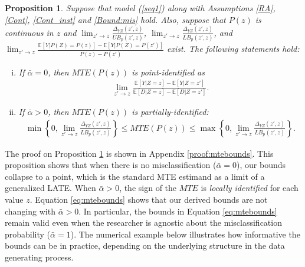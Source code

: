 \documentclass[11pt,reqno]{amsart}
\theoremstyle{plain}
\newtheorem{proposition}{Proposition}
\numberwithin{equation}{section}
\begin{document}
\begin{proposition}\label{prop:mtebounds}
Suppose that model (\ref{seq1}) along with Assumptions \ref{RA}, \ref{Cont}, \ref{Cont_inst} and \ref{Bound:mis} hold. Also, suppose that $P(z)$ is continuous in $z$ and $\lim_{z' \rightarrow z} \frac{\Delta_{YZ}(z',z)}{UB_p(z',z)}$, $\lim_{z' \rightarrow z} \frac{\Delta_{YZ}(z',z)}{LB_p(z',z)}$, and $\lim_{z' \rightarrow z} \frac{\mathbb E[Y\vert P(Z)=P(z)]-\mathbb E[Y\vert P(Z)=P(z')]}{P(z)-P(z')}$ exist. The following statements hold:
\begin{enumerate}[(i)]
\item If $\bar{\alpha}=0$, then $MTE(P(z))$ is point-identified as
\begin{eqnarray}\label{eq:late}
\lim_{z' \rightarrow z} \frac{\mathbb E[Y\vert Z=z]-\mathbb E[Y\vert Z=z']}{\mathbb E[D\vert Z=z]-\mathbb E[D\vert Z=z']}.
\end{eqnarray}
\item If $\bar{\alpha} > 0$, then $MTE(P(z))$ is partially-identified:
\begin{eqnarray}\label{eq:mtebounds}
\min\left\{0,  \lim_{z' \rightarrow z} \frac{\Delta_{YZ}(z',z)}{LB_p(z',z)}\right\} \leq MTE(P(z))\leq \max\left\{0,  \lim_{z' \rightarrow z} \frac{\Delta_{YZ}(z',z)}{LB_p(z',z)}\right\}. 
\end{eqnarray}
\end{enumerate}
\end{proposition}
The proof on Proposition \ref{prop:mtebounds} is shown in Appendix \ref{proof:mtebounds}. This proposition shows that when there is no misclassification ($\bar{\alpha}=0$), our bounds collapse to a point, which is the standard MTE estimand as a limit of a generalized LATE.  When $\bar{\alpha} >0$, the sign of the $MTE$ is \textit{locally identified} for each value $z$. Equation \eqref{eq:mtebounds} shows that our derived bounds are not changing with $\bar{\alpha} >0$. In particular, the bounds in Equation \eqref{eq:mtebounds} remain valid even when the researcher is agnostic about the misclassification probability ($\bar{\alpha}=1$).  The numerical example below illustrates how informative the bounds can be in practice, depending on the underlying structure in the data generating process. 
\end{document}
